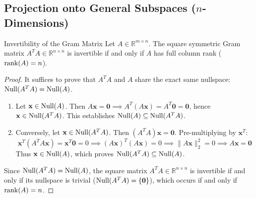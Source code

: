 \subsection{Projection onto General Subspaces (\texorpdfstring{$n$}{n}-Dimensions)}

\begin{theorembox}{Invertibility of the Gram Matrix}
\label{thm:gram_invertible}
Let $A \in \mathbb{R}^{m \times n}$. The square symmetric Gram matrix $A^T A \in \mathbb{R}^{n \times n}$ is invertible if and only if $A$ has full column rank ($\operatorname{rank}(A) = n$).
\end{theorembox}

\begin{proof}
It suffices to prove that $A^T A$ and $A$ share the exact same nullspace: $\operatorname{Null}(A^T A) = \operatorname{Null}(A)$.
\begin{enumerate}
    \item Let $\mathbf{x} \in \operatorname{Null}(A)$. Then $A\mathbf{x} = \mathbf{0} \implies A^T (A\mathbf{x}) = A^T \mathbf{0} = \mathbf{0}$, hence $\mathbf{x} \in \operatorname{Null}(A^T A)$. This establishes $\operatorname{Null}(A) \subseteq \operatorname{Null}(A^T A)$.
    \item Conversely, let $\mathbf{x} \in \operatorname{Null}(A^T A)$. Then $(A^T A)\mathbf{x} = \mathbf{0}$. Pre-multiplying by $\mathbf{x}^T$:
    \begin{equation}
    \mathbf{x}^T (A^T A \mathbf{x}) = \mathbf{x}^T \mathbf{0} = 0 \implies (A\mathbf{x})^T (A\mathbf{x}) = 0 \implies \|A\mathbf{x}\|_2^2 = 0 \implies A\mathbf{x} = \mathbf{0}
    \end{equation}
    Thus $\mathbf{x} \in \operatorname{Null}(A)$, which proves $\operatorname{Null}(A^T A) \subseteq \operatorname{Null}(A)$.
\end{enumerate}
Since $\operatorname{Null}(A^T A) = \operatorname{Null}(A)$, the square matrix $A^T A \in \mathbb{R}^{n \times n}$ is invertible if and only if its nullspace is trivial ($\operatorname{Null}(A^T A) = \{\mathbf{0}\}$), which occurs if and only if $\operatorname{rank}(A) = n$.
\end{proof}

